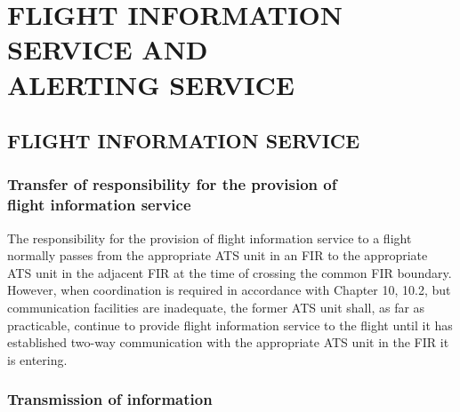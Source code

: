 
\chapterbegin

\section[Flight Information Service and Alerting Service]{FLIGHT INFORMATION SERVICE AND \\ ALERTING SERVICE}

\subsection[Flight information service]{FLIGHT INFORMATION SERVICE}


\subsubsection{Transfer of responsibility for the provision of \\ flight information service}

The responsibility for the provision of flight information service to a flight normally passes from the appropriate ATS unit in an FIR to the appropriate ATS unit in the adjacent FIR at the time of crossing the common FIR boundary. However, when coordination is required in accordance with Chapter 10, 10.2, but communication facilities are inadequate, the former ATS unit shall, as far as practicable, continue to provide flight information service to the flight until it has established two-way communication with the appropriate ATS unit in the FIR it is entering.

\subsubsection{Transmission of information}

